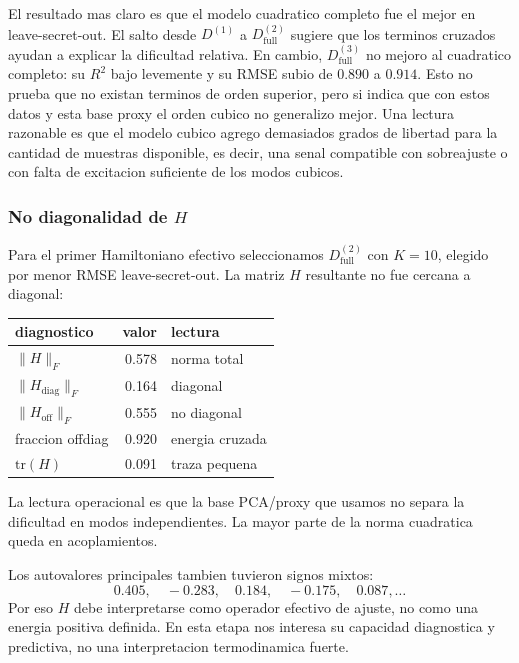 ﻿\documentclass[10pt,twocolumn]{article}
\begin{document}
El resultado mas claro es que el modelo cuadratico completo fue el mejor en leave-secret-out. El salto desde \(D^{(1)}\) a \(D^{(2)}_{\mathrm{full}}\) sugiere que los terminos cruzados ayudan a explicar la dificultad relativa. En cambio, \(D^{(3)}_{\mathrm{full}}\) no mejoro al cuadratico completo: su \(R^2\) bajo levemente y su RMSE subio de \(0.890\) a \(0.914\). Esto no prueba que no existan terminos de orden superior, pero si indica que con estos datos y esta base proxy el orden cubico no generalizo mejor. Una lectura razonable es que el modelo cubico agrego demasiados grados de libertad para la cantidad de muestras disponible, es decir, una senal compatible con sobreajuste o con falta de excitacion suficiente de los modos cubicos.

\subsubsection*{No diagonalidad de \texorpdfstring{\(H\)}{H}}

Para el primer Hamiltoniano efectivo seleccionamos \(D^{(2)}_{\mathrm{full}}\) con \(K=10\), elegido por menor RMSE leave-secret-out. La matriz \(H\) resultante no fue cercana a diagonal:

\begin{center}
\scriptsize
\begin{tabular}{@{}lrl@{}}
\toprule
diagnostico & valor & lectura \\
\midrule
\(\|H\|_F\) & 0.578 & norma total \\
\(\|H_{\mathrm{diag}}\|_F\) & 0.164 & diagonal \\
\(\|H_{\mathrm{off}}\|_F\) & 0.555 & no diagonal \\
fraccion offdiag & 0.920 & energia cruzada \\
\(\mathrm{tr}(H)\) & 0.091 & traza pequena \\
\bottomrule
\end{tabular}
\end{center}

La lectura operacional es que la base PCA/proxy que usamos no separa la dificultad en modos independientes. La mayor parte de la norma cuadratica queda en acoplamientos. 


Los autovalores principales tambien tuvieron signos mixtos:
\[
0.405,\quad -0.283,\quad 0.184,\quad -0.175,\quad 0.087,\ldots
\]
Por eso \(H\) debe interpretarse como operador efectivo de ajuste, no como una energia positiva definida. En esta etapa nos interesa su capacidad diagnostica y predictiva, no una interpretacion termodinamica fuerte.
\end{document}
